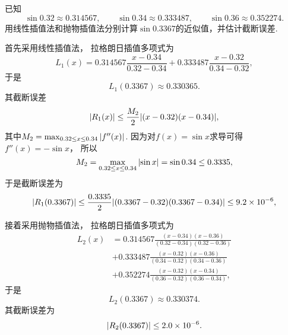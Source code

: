 \begin{example}
已知\begin{equation*}
	\sin0.32 \approx \num{0.314567},
	\qquad
	\sin0.34 \approx \num{0.333487},
	\qquad
	\sin0.36 \approx \num{0.352274}.
\end{equation*}
用线性插值法和抛物插值法分别计算\(\sin\num{0.3367}\)的近似值，并估计截断误差.
\begin{solution}
首先采用线性插值法，
拉格朗日插值多项式为\begin{equation*}
	L_1(x) = \num{0.314567} \frac{x-0.34}{0.32-0.34}
	+ \num{0.333487} \frac{x-0.32}{0.34-0.32},
\end{equation*}
于是\begin{equation*}
	L_1(\num{0.3367})
	\approx \num{0.330365}.
\end{equation*}
其截断误差\begin{equation*}
	\abs{R_1(x)}
	\leq \frac{M_2}{2} \abs{(x-0.32)(x-0.34)},
\end{equation*}
其中\(M_2 = \max_{0.32 \leq x \leq 0.34} \abs{f''(x)}\).
因为对\(f(x) = \sin x\)求导可得\(f''(x) = -\sin x\)，
所以\begin{equation*}
	M_2
	= \max_{0.32 \leq x \leq 0.34} \abs{\sin x}
	= \sin0.34
	\leq \num{0.3335},
\end{equation*}
于是截断误差为\begin{equation*}
	\abs{R_1(\num{0.3367})}
	\leq \frac{\num{0.3335}}{2} \abs{(\num{0.3367}-0.32)(\num{0.3367}-0.34)}
	\leq \num{9.2e-6},
\end{equation*}

接着采用抛物插值法，
拉格朗日插值多项式为\begin{align*}
	L_2(x) &= \num{0.314567} \frac{(x-0.34)(x-0.36)}{(0.32-0.34)(0.32-0.36)} \\
	&+ \num{0.333487} \frac{(x-0.32)(x-0.36)}{(0.34-0.32)(0.34-0.36)} \\
	&+ \num{0.352274} \frac{(x-0.32)(x-0.34)}{(0.36-0.32)(0.36-0.34)},
\end{align*}
于是\begin{equation*}
	L_2(\num{0.3367})
	\approx \num{0.330374}.
\end{equation*}
其截断误差为\begin{equation*}
	\abs{R_2(\num{0.3367})}
	\leq \num{2.0e-6}.
\end{equation*}
\end{solution}
\end{example}
